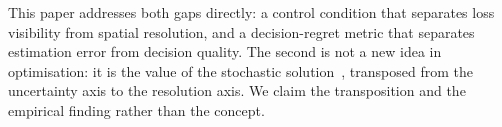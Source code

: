 This paper addresses both gaps directly: a control condition that separates loss
visibility from spatial resolution, and a decision-regret metric that separates
estimation error from decision quality. The second is not a new idea in optimisation:
it is the value of the stochastic solution~\citep{BirgeLouveaux2011}, transposed from the
uncertainty axis to the resolution axis. We claim the transposition and the empirical
finding rather than the concept.
